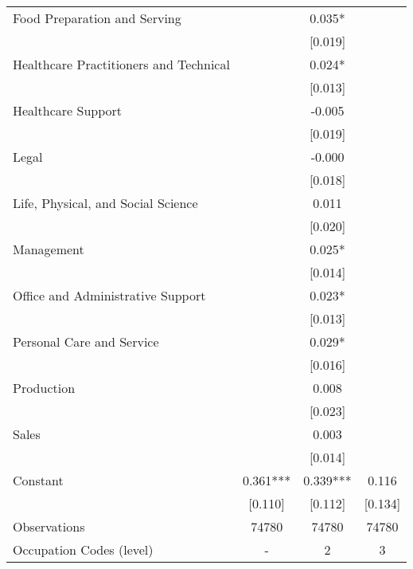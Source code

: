 \documentclass[a4paper, 11.5 pt]{article}
\theoremstyle{plain}
\begin{document}
\begin{doublespace}
\begin{table}[htbp]
{\begin{tabular}{l*{3}{c}}
Food Preparation and Serving &               &       0.035*  &               \\
                    &               &     [0.019]   &               \\
Healthcare Practitioners and Technical &               &       0.024*  &               \\
                    &               &     [0.013]   &               \\
Healthcare Support &               &      -0.005   &               \\
                    &               &     [0.019]   &               \\
Legal &               &      -0.000   &               \\
                    &               &     [0.018]   &               \\
Life, Physical, and Social Science &               &       0.011   &               \\
                    &               &     [0.020]   &               \\
Management &               &       0.025*  &               \\
                    &               &     [0.014]   &               \\
Office and Administrative Support &               &       0.023*  &               \\
                    &               &     [0.013]   &               \\
Personal Care and Service &               &       0.029*  &               \\
                    &               &     [0.016]   &               \\
Production &               &       0.008   &               \\
                    &               &     [0.023]   &               \\
Sales &               &       0.003   &               \\
                    &               &     [0.014]   &               \\
Constant            &       0.361***&       0.339***&       0.116   \\
                    &     [0.110]   &     [0.112]   &     [0.134]   \\
\midrule
Observations        &       74780   &       74780   &       74780   \\
Occupation Codes (level) &-&2&3\\

\end{tabular}}
\end{table}
\end{doublespace}
\end{document}
